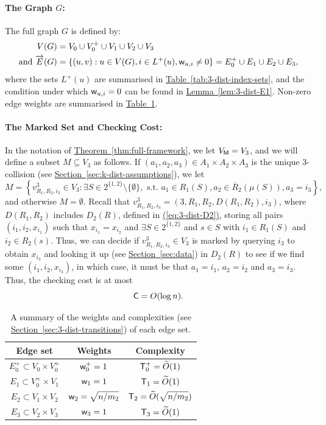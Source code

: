 \documentclass{article}
\newcommand{\eq}[1]{\hyperref[eq:#1]{(\ref*{eq:#1})}}
\renewcommand{\sec}[1]{\hyperref[sec:#1]{Section~\ref*{sec:#1}}}
\newcommand{\thm}[1]{\hyperref[thm:#1]{Theorem~\ref*{thm:#1}}}
\newcommand{\lem}[1]{\hyperref[lem:#1]{Lemma~\ref*{lem:#1}}}
\newcommand{\tabl}[1]{\hyperref[tab:#1]{Table~\ref*{tab:#1}}}
\renewcommand{\>}{\rangle}
\newcommand{\<}{\langle}
\renewcommand{\(}{\left(}
\renewcommand{\)}{\right)}
\def\w{{\sf w}}
\begin{document}
\paragraph{The Graph $G$:} The full graph $G$ is defined by:
\begin{align*}
V(G)&=V_0\cup V_0^+ \cup V_1\cup V_2\cup V_3\\
\mbox{and }\overrightarrow{E}(G) &= \{(u,v):u\in V(G),i\in L^+(u), \w_{u,i}\neq 0\} = E_0^+ \cup E_1 \cup E_2 \cup E_3,
\end{align*}
where the sets $L^+(u)$ are summarised in \tabl{3-dist-index-sets}, and the condition under which $\w_{u,i}=0$ can be found in \lem{3-dist-E1}. Non-zero edge weights are summarised in \tabl{3-dist-weights}.

\paragraph{The Marked Set and Checking Cost:}  In the notation of \thm{full-framework}, we let $V_{\sf M}=V_3$, and we will define a subset $M\subseteq V_3$ as follows. 
If $(a_1,a_2,a_3)\in A_1\times A_2\times A_3$ is the unique 3-collision (see \sec{k-dist-assumptions}), we let 
\begin{equation}
M = \left\{v^3_{R_1,R_2,i_3}\in V_3: \exists S\in 2^{\{1,2\}}\setminus\{\emptyset\}, \mbox{ s.t. }a_1\in R_1(S),a_2\in \overline{R}_2(\mu(S)), a_3=i_3\right\},\label{eq:3-dist-M}
\end{equation}
and otherwise $M=\emptyset$.
Recall that $v^3_{R_1,R_2,i_3}=(3,R_1,R_2,D(R_1,R_2),i_3)$, where $D(R_1,R_2)$ includes $D_2(R)$, defined in \eq{3-dist-D2}, storing all pairs $(i_1,i_2,x_{i_1})$ such that $x_{i_1}=x_{i_2}$ and $\exists S\in 2^{\{1,2\}}$ and $s\in S$ with $i_1\in R_1(S)$ and $i_2\in R_2(s)$.
Thus, we can decide if $v^3_{R_1,R_2,i_3}\in V_3$ is marked by querying $i_3$ to obtain $x_{i_3}$ and looking it up (see \sec{data}) in $D_2(R)$ to see if we find some $(i_1,i_2,x_{i_3})$, in which case, it must be that $a_1=i_1$, $a_2=i_2$ and $a_3=i_3$. Thus, the checking cost is at most
\begin{equation}
{\sf C}=O(\log n).\label{eq:3-dist-C}
\end{equation}

\begin{table}
\renewcommand{\arraystretch}{1.5}
\centering
\begin{tabular}{|c|c|c|}
\hline
Edge set & Weights & Complexity\\
\hline
\hline
$E_0^+\subset V_0\times V_0^+$ & $\w_0^+=1$ & ${\sf T}_0^+=\widetilde{O}(1)$\\
\hline
$E_1\subset V_0^+\times V_1$ & $\w_1=1$ & ${\sf T}_1=\widetilde{O}(1)$\\
\hline
$E_2\subset V_1\times V_2$ & $\w_2=\sqrt{n/m_2}$ & ${\sf T}_2=\widetilde{O}(\sqrt{n/m_2})$\\
\hline
$E_3\subset V_2\times V_3$ & $\w_3=1$ & ${\sf T}_3=\widetilde{O}(1)$\\
\hline
\end{tabular}
\caption{A summary of the weights and complexities (see \sec{3-dist-transitions}) of each edge set.}\label{tab:3-dist-weights}
\end{table}
\end{document}
